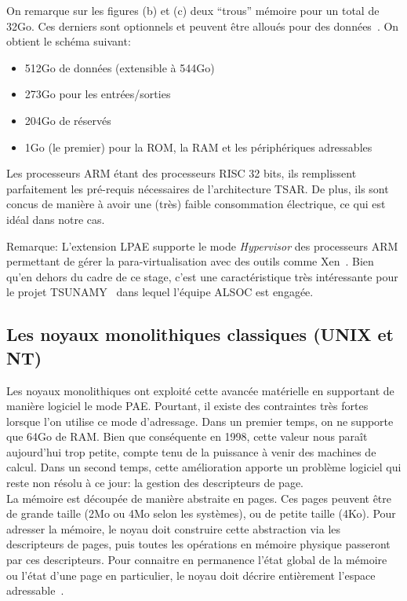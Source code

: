     On remarque sur les figures (b) et (c) deux ``trous'' mémoire pour un total
    de 32Go. Ces derniers sont optionnels et peuvent être alloués pour des
    données~\citep{arm2012principles}. On obtient le schéma suivant:

    \begin{itemize}
      \item 512Go de données (extensible à 544Go)
      \item 273Go pour les entrées/sorties
      \item 204Go de réservés
      \item 1Go (le premier) pour la ROM, la RAM et les périphériques
        adressables
    \end{itemize}

    Les processeurs ARM étant des processeurs RISC 32 bits, ils remplissent
    parfaitement les pré-requis nécessaires de l'architecture TSAR. De plus, ils
    sont concus de manière à avoir une (très) faible consommation électrique, ce
    qui est idéal dans notre cas.

    \begin{paragraph}{Remarque:}
      L'extension LPAE supporte le mode \textit{Hypervisor} des processeurs ARM
      permettant de gérer la para-virtualisation avec des outils comme
      Xen~\cite{barham2003xen}. Bien qu'en dehors du cadre de ce stage, c'est
      une caractéristique très intéressante pour le projet
      TSUNAMY~\cite{tsunamy2013web} dans lequel l'équipe ALSOC est engagée.
    \end{paragraph}


    \subsection{Les noyaux monolithiques classiques (UNIX et NT)}

      Les noyaux monolithiques ont exploité cette avancée matérielle en
      supportant de manière logiciel le mode PAE. Pourtant, il existe des
      contraintes très fortes lorsque l'on utilise ce mode d'adressage. Dans un
      premier temps, on ne supporte que 64Go de RAM. Bien que conséquente en
      1998, cette valeur nous paraît aujourd'hui trop petite, compte tenu de la
      puissance à venir des machines de calcul.  Dans un second temps, cette
      amélioration apporte un problème logiciel qui reste non résolu à ce
      jour: la gestion des descripteurs de page.\\

      La mémoire est découpée de manière abstraite en pages. Ces pages peuvent
      être de grande taille (2Mo ou 4Mo selon les systèmes), ou de petite taille
      (4Ko). Pour adresser la mémoire, le noyau doit construire cette
      abstraction via les descripteurs de pages, puis toutes les opérations en
      mémoire physique passeront par ces descripteurs. Pour connaitre en
      permanence l'état global de la mémoire ou l'état d'une page en
      particulier, le noyau doit décrire entièrement l'espace
      adressable~\citep{cranor1999uvm, gorman2004understanding,
        russinovich2012windows, dillon2000design, steldt2009memory,
        steldtXXXXopenbsd}.

